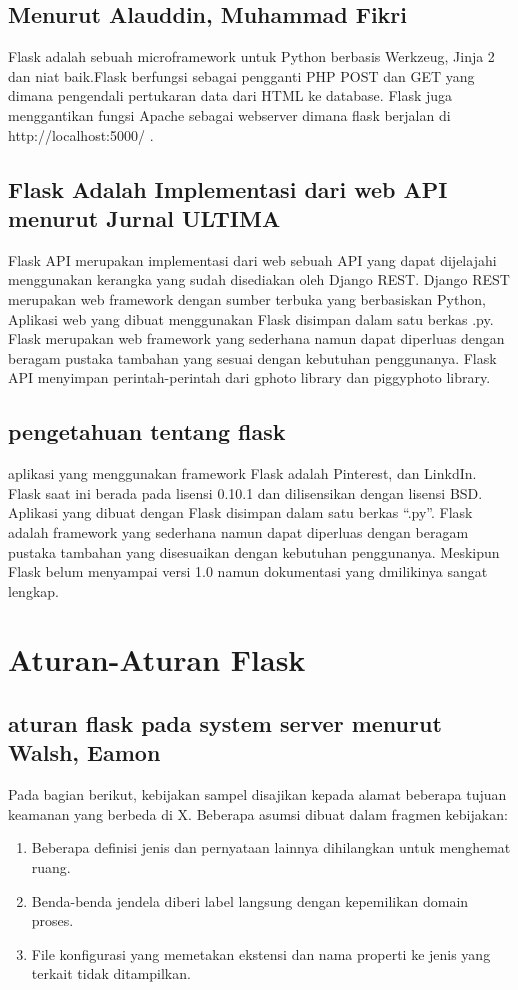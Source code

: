 \subsection{Menurut Alauddin, Muhammad Fikri}
Flask adalah sebuah microframework untuk Python berbasis Werkzeug, Jinja 2 dan niat baik.Flask berfungsi sebagai pengganti PHP POST dan GET yang dimana pengendali pertukaran data dari HTML ke database. Flask juga menggantikan fungsi Apache sebagai webserver dimana flask berjalan di http://localhost:5000/ \cite{alauddin2017implementasi}.

\subsection{Flask Adalah Implementasi dari web API menurut Jurnal ULTIMA}
Flask API merupakan implementasi dari web sebuah API yang dapat dijelajahi menggunakan kerangka yang sudah disediakan oleh Django REST. Django REST merupakan web framework dengan sumber terbuka yang berbasiskan Python, Aplikasi web yang dibuat menggunakan Flask disimpan dalam satu berkas .py. Flask merupakan web framework yang sederhana namun dapat diperluas dengan beragam pustaka tambahan yang sesuai dengan kebutuhan penggunanya. Flask API menyimpan perintah-perintah dari gphoto library dan piggyphoto library\cite{computingaplikasi}. 

\subsection{pengetahuan tentang flask}
aplikasi yang menggunakan framework Flask adalah Pinterest, dan LinkdIn. Flask saat ini berada pada lisensi 0.10.1 dan dilisensikan dengan lisensi BSD. Aplikasi yang dibuat dengan Flask disimpan dalam satu berkas “.py”. Flask adalah framework yang sederhana namun dapat diperluas dengan beragam pustaka tambahan yang disesuaikan dengan kebutuhan penggunanya. Meskipun Flask belum menyampai versi 1.0 namun dokumentasi yang dmilikinya sangat lengkap\cite{samudera2015perancangan}.

\section{Aturan-Aturan Flask}
\subsection{aturan flask pada system server menurut Walsh, Eamon}
Pada bagian berikut, kebijakan sampel disajikan kepada
alamat beberapa tujuan keamanan yang berbeda di X. Beberapa asumsi
dibuat dalam fragmen kebijakan:
\begin{enumerate}
\item Beberapa definisi jenis dan pernyataan lainnya
dihilangkan untuk menghemat ruang.
\item Benda-benda jendela diberi label langsung dengan kepemilikan
domain proses.
\item File konfigurasi yang memetakan ekstensi dan
nama properti ke jenis yang terkait tidak
ditampilkan.
\end{enumerate}

